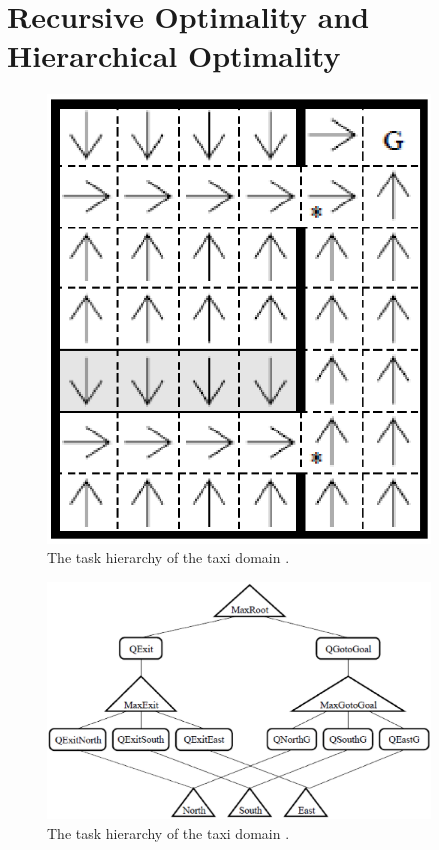 \section{Recursive Optimality and Hierarchical Optimality}
\begin{figure}[t]
\begin{center}
    \includegraphics[width=4in] {./figures/Maze.eps}
\end{center}
\caption{The task hierarchy of the taxi domain \cite{MaxQJ}.}
\label{fig:taxi}
\end{figure}
\begin{figure}[t]
\begin{center}
    \includegraphics[width=4in] {./figures/MazeH.eps}
\end{center}
\caption{The task hierarchy of the taxi domain \cite{MaxQJ}.}
\label{fig:taxi}
\end{figure}

